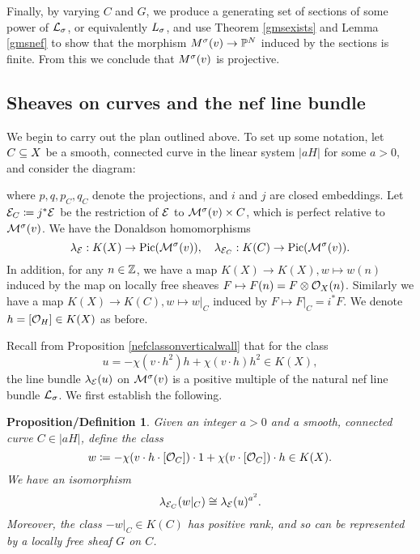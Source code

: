 \documentclass[letterpaper,12pt]{amsart}
\newtheorem{propdef}[thm]{Proposition/Definition}
\theoremstyle{remark}
\begin{document}
Finally, by varying $C$ and $G$, we produce a generating set of sections of some power of $\mathcal{L}_\sigma$, or equivalently $L_\sigma$, and use Theorem \ref{gmsexists} and Lemma \ref{gmsnef} to show that the morphism $M^\sigma(v) \to \mathbb{P}^N$ induced by the sections is finite. From this we conclude that $M^\sigma(v)$ is projective.

\subsection{Sheaves on curves and the nef line bundle}
We begin to carry out the plan outlined above. To set up some notation, let $C \subseteq X$ be a smooth, connected curve in the linear system $|a H|$ for some $a > 0$, and consider the diagram:
\begin{center}
\end{center}
where $p, q, p_C, q_C$ denote the projections, and $i$ and $j$ are closed embeddings. Let $\mathcal{E}_C \coloneqq j^*\mathcal{E}$ be the restriction of $\mathcal{E}$ to $\mathcal{M}^\sigma(v) \times C$, which is perfect relative to $\mathcal{M}^\sigma(v)$. We have the Donaldson homomorphisms
\[ \lambda_{\mathcal{E}}: K(X) \to \mathrm{Pic}(\mathcal{M}^\sigma(v)), \quad \lambda_{\mathcal{E}_C}: K(C) \to \mathrm{Pic}(\mathcal{M}^\sigma(v)). \]
In addition, for any $n \in \mathbb{Z}$, we have a map $K(X) \to K(X), w \mapsto w(n)$ induced by the map on locally free sheaves $F \mapsto F(n) = F \otimes \mathcal{O}_X(n)$. Similarly we have a map $K(X) \to K(C), w \mapsto w|_C$ induced by $F \mapsto F|_C = i^*F$. We denote $h = [\mathcal{O}_H] \in K(X)$ as before.

Recall from Proposition \ref{nefclassonverticalwall} that for the class 
\[ u = -\chi(v \cdot h^2) h + \chi(v \cdot h) h^2 \in K(X), \]
the line bundle $\lambda_{\mathcal{E}}(u)$ on $\mathcal{M}^\sigma(v)$ is a positive multiple of the natural nef line bundle $\mathcal{L}_\sigma$. We first establish the following.
\begin{propdef}\label{nefpowerfromcurves}
    Given an integer $a > 0$ and a smooth, connected curve $C \in |a H|$, define the class
    \[ w \coloneqq -\chi(v \cdot h \cdot [\mathcal{O}_C]) \cdot 1 + \chi(v \cdot [\mathcal{O}_C]) \cdot h \in K(X). \]
    We have an isomorphism
    \[ \lambda_{\mathcal{E}_C}(w|_C) \cong \lambda_{\mathcal{E}}(u)^{a^2}. \]
    Moreover, the class $-w|_C \in K(C)$ has positive rank, and so can be represented by a locally free sheaf $G$ on $C$.
\end{propdef}
\end{document}
